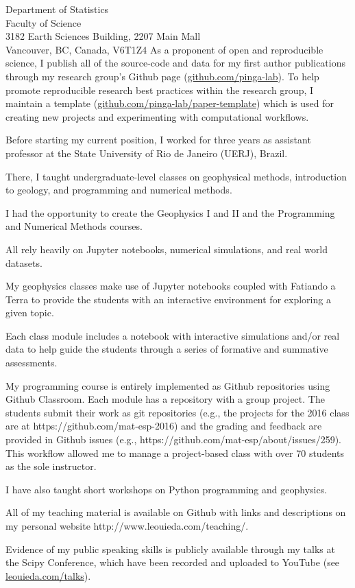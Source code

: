 \documentclass[11pt]{letter}
\begin{document}
\begin{letter}{
    Department of Statistics
    \\
    Faculty of Science
    \\
    3182 Earth Sciences Building, 2207 Main Mall
    \\
    Vancouver, BC, Canada, V6T1Z4
}
As a proponent of open and reproducible science, I publish all of the
source-code and data for my first author publications through my research
group's Github page
(\href{https://github.com/pinga-lab}{github.com/pinga-lab}).
To help promote reproducible research best practices within the research group,
I maintain a template
(\href{https://github.com/pinga-lab/paper-template}{github.com/pinga-lab/paper-template})
which is used for creating new projects and experimenting with computational
workflows.


Before starting my current position, I worked for three years as assistant
professor at the State University of Rio de Janeiro (UERJ), Brazil.

There, I taught undergraduate-level classes on geophysical methods,
introduction to geology, and programming and numerical methods.

I had the opportunity to create the Geophysics I and II and the Programming
and Numerical Methods courses.

All rely heavily on Jupyter notebooks, numerical simulations, and real world
datasets.

My geophysics classes make use of Jupyter notebooks coupled with Fatiando a
Terra to provide the students with an interactive environment for exploring a
given topic.

Each class module includes a notebook with interactive simulations and/or real
data to help guide the students through a series of formative and summative
assessments.

My programming course is entirely implemented as Github repositories using
Github Classroom.
Each module has a repository with a group project.
The students submit their work as git repositories (e.g., the projects for the
2016 class are at https://github.com/mat-esp-2016) and the grading and feedback
are provided in Github issues (e.g.,
https://github.com/mat-esp/about/issues/259).
This workflow allowed me to manage a project-based class with over 70 students
as the sole instructor.

I have also taught short workshops on Python programming and geophysics.

All of my teaching material is available on Github with links and descriptions
on my personal website http://www.leouieda.com/teaching/.

Evidence of my public speaking skills is publicly available through my talks at
the Scipy Conference, which have been recorded and uploaded to YouTube (see
\href{http://www.leouieda.com/talks/}{leouieda.com/talks}).



\end{letter}
\end{document}
